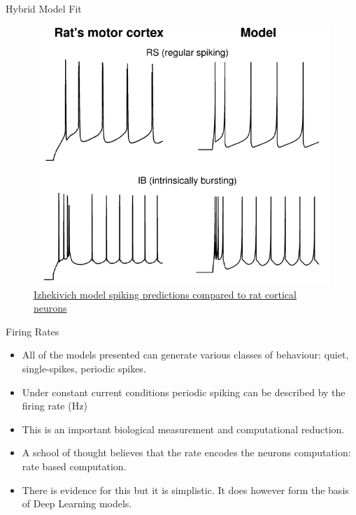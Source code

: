 \documentclass[
  ignorenonframetext,
]{beamer}
\begin{document}
\begin{frame}{Hybrid Model Fit}
\protect\hypertarget{hybrid-model-fit}{}
\begin{figure}

{\centering \includegraphics[width=\textwidth,height=0.6\textheight]{./images/izspike.png}

}

\caption{\href{https://www.izhikevich.org/publications/spikes.html}{Izhekivich
model spiking predictions compared to rat cortical neurons}}

\end{figure}
\end{frame}

\begin{frame}{Firing Rates}
\protect\hypertarget{firing-rates}{}
\begin{itemize}
\item
  All of the models presented can generate various classes of behaviour:
  quiet, single-spikes, periodic spikes.
\item
  Under constant current conditions periodic spiking can be described by
  the firing rate (Hz)
\item
  This is an important biological measurement and computational
  reduction.
\item
  A school of thought believes that the rate encodes the neurons
  computation: rate based computation.
\item
  There is evidence for this but it is simplistic. It does however form
  the basis of Deep Learning models.
\end{itemize}
\end{frame}
\end{document}
